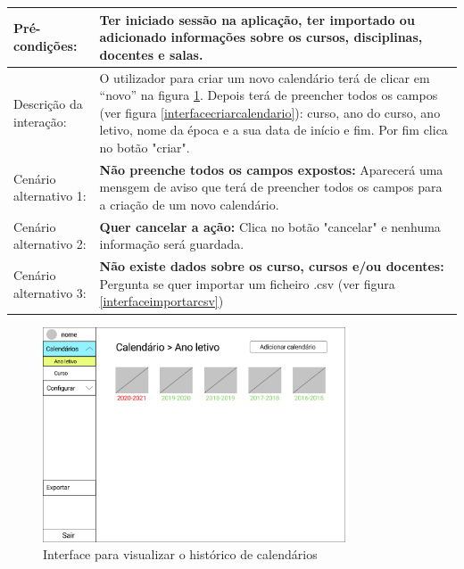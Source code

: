 \documentclass[11pt, twoside]{report}
\begin{document}
\begin{table}[H]
\begin{center}
\begin{tabularx}{\textwidth}{|l|X|}
				\hline
				Pré-condições:           & Ter iniciado sessão na aplicação, ter importado ou adicionado informações sobre os cursos, disciplinas, docentes e salas.                                                                                                                                                                                         \\
				\hline
				Descrição da interação: & O utilizador para criar um novo calendário terá de clicar em ``novo'' na figura \ref{interfacevercalendario}. Depois terá de preencher todos os campos (ver figura \ref{interfacecriarcalendario}): curso, ano do curso, ano letivo, nome da época e a sua data de início e fim. Por fim clica no botão "criar". \\
				\hline
				Cenário alternativo 1:     & \textbf{Não preenche todos os campos  expostos:} Aparecerá uma mensgem de aviso que terá de preencher todos os campos para a criação de um novo calendário.                                                                                                                                                      \\
				\hline
				Cenário alternativo 2:     & \textbf{Quer cancelar a ação:} Clica no botão "cancelar" e nenhuma informação será guardada.                                                                                                                                                                                                                     \\
				\hline
				Cenário alternativo 3:     & \textbf{Não existe dados sobre os curso, cursos e/ou docentes:} Pergunta se quer importar um ficheiro .csv (ver figura \ref{interfaceimportarcsv})                                                                                                                                                                    \\
				\hline
			\end{tabularx}
		\end{center}
	\end{table}
	
	
	\begin{figure}[H] 
		\centering 
		\includegraphics[width=0.8\textwidth,height=0.8\textheight,keepaspectratio]{image/prototipowireframes/pesquisacalendarioanoletivo}
		\caption{Interface para visualizar o histórico de calendários}
		\label{interfacevercalendario}
	\end{figure}
	
\end{document}

